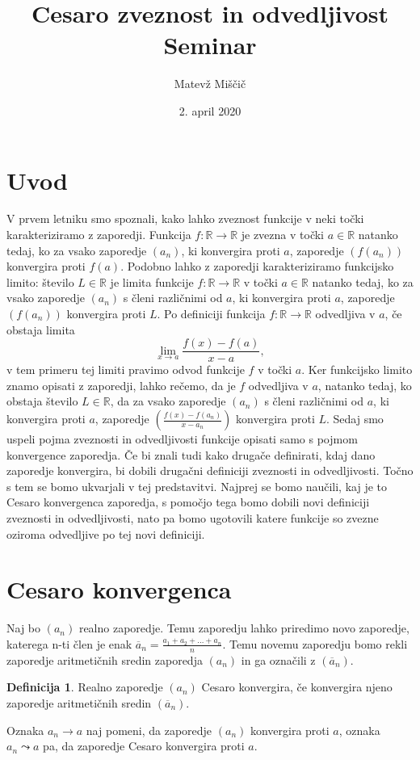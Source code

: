 \documentclass[a4paper,12pt]{article}
\title{Cesaro zveznost in odvedljivost \\ Seminar}
\author{Matevž Miščič}
\date{2. april 2020}
\theoremstyle{definition}
\newtheorem{definicija}{Definicija}
\theoremstyle{plain}
\begin{document}
\maketitle{}

\section*{Uvod}
V prvem letniku smo spoznali, kako lahko zveznost funkcije v neki točki karakteriziramo z zaporedji. Funkcija $f: \mathbb{R} \rightarrow \mathbb{R}$ je zvezna v točki $a \in \mathbb{R}$ natanko tedaj, ko za vsako zaporedje $(a_n)$, ki konvergira proti $a$, zaporedje $(f(a_n))$ konvergira proti $f(a)$. Podobno lahko z zaporedji karakteriziramo funkcijsko limito: število $L \in \mathbb{R}$ je limita funkcije $f: \mathbb{R} \rightarrow \mathbb{R}$ v točki $a \in \mathbb{R}$ natanko tedaj, ko za vsako zaporedje $(a_n)$ s členi različnimi od $a$, ki konvergira proti $a$, zaporedje $(f(a_n))$ konvergira proti $L$. Po definiciji funkcija $f: \mathbb{R} \rightarrow \mathbb{R}$ odvedljiva v $a$, če obstaja limita $$\lim_{x \rightarrow a} \frac{f(x)-f(a)}{x-a},$$ v tem primeru tej limiti pravimo odvod funkcije $f$ v točki $a$. Ker funkcijsko limito znamo opisati z zaporedji, lahko rečemo, da je $f$ odvedljiva v $a$, natanko tedaj, ko obstaja število $L \in \mathbb{R}$, da za vsako zaporedje $(a_n)$ s členi različnimi od $a$, ki konvergira proti $a$, zaporedje $(\frac{f(x)-f(a_n)}{x-a_n})$ konvergira proti $L$. Sedaj smo uspeli pojma zveznosti in odvedljivosti funkcije opisati samo s pojmom konvergence zaporedja. Če bi znali tudi kako drugače definirati, kdaj dano zaporedje konvergira, bi dobili drugačni definiciji zveznosti in odvedljivosti. Točno s tem se bomo ukvarjali v tej predstavitvi. Najprej se bomo naučili, kaj je to Cesaro konvergenca zaporedja, s pomočjo tega bomo dobili novi definiciji zveznosti in odvedljivosti, nato pa bomo ugotovili katere funkcije so zvezne oziroma odvedljive po tej novi definiciji.



\section{Cesaro konvergenca}
Naj bo $(a_n)$ realno zaporedje. Temu zaporedju lahko priredimo novo zaporedje, katerega n-ti člen je enak $\overline{a}_n = \frac{a_1+a_2+\ldots+a_n}{n}$. Temu novemu zaporedju bomo rekli zaporedje aritmetičnih sredin zaporedja $(a_n)$ in ga označili z $(\overline{a}_n)$.
\begin{definicija}
    Realno zaporedje $(a_n)$ Cesaro konvergira, če konvergira njeno zaporedje aritmetičnih sredin $(\overline{a}_n)$.
\end{definicija}
Oznaka $a_n \rightarrow a$ naj pomeni, da zaporedje $(a_n)$ konvergira proti $a$, oznaka $a_n \leadsto a$ pa, da zaporedje Cesaro konvergira proti $a$. 
\end{document}
